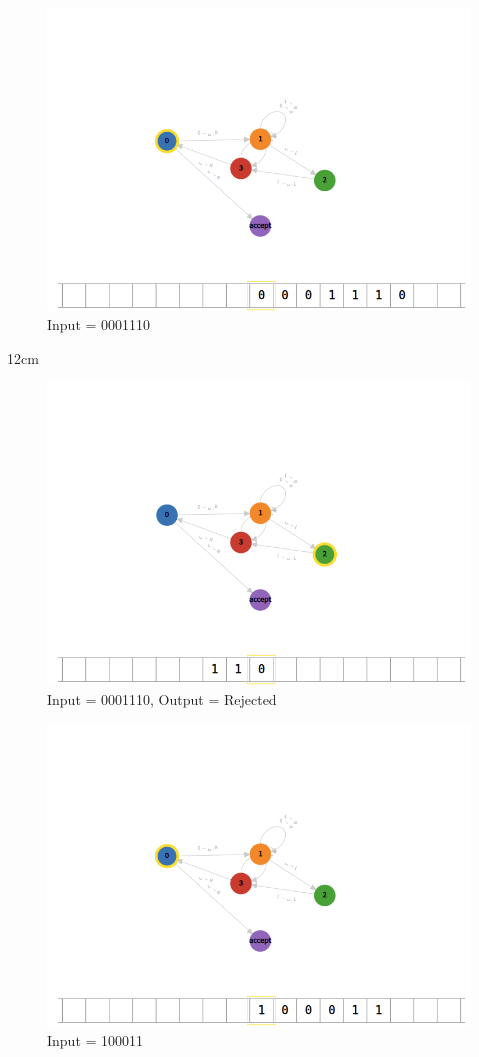 \documentclass[12pt]{article}
\begin{document}
\begin{figure}[bp!]
    \caption{Input = 0001110}
    \centering
    \includegraphics[width=12cm]{Q1/0001110.png}  
\end{figure}12cm
\begin{figure}[bp!]
    \caption{Input = 0001110, Output = Rejected}
    \centering
    \includegraphics[width=12cm]{Q1/001101o.png}  
\end{figure}
\begin{figure}[bp!]
    \caption{Input = 100011}
    \centering
    \includegraphics[width=12cm]{Q1/100011.png}
\end{figure}
\end{document}
